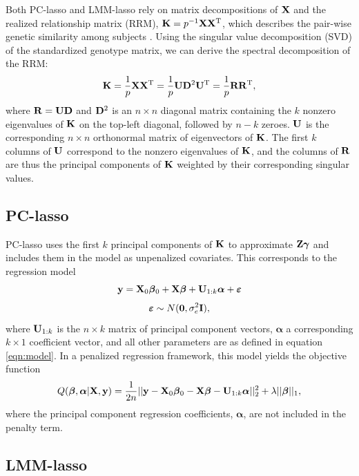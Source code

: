 Both PC-lasso and LMM-lasso rely on matrix decompositions of $\mathbf{X}$ and the realized relationship matrix (RRM), $\mathbf{K} = p^{-1} \mathbf{X} \mathbf{X}^{\text{T}}$, which describes the pair-wise genetic similarity among subjects \citep{patterson2006population, hayes2009increased}. Using the singular value decomposition (SVD) of the standardized genotype matrix, we can derive the spectral decomposition of the RRM: 
\begin{equation}
    \label{eqn:k}
    \mathbf{K} = \frac{1}{p} \mathbf{X} \mathbf{X}^{\text{T}} = \frac{1}{p} \mathbf{U} \mathbf{D}^2 \mathbf{U}^{\text{T}} = \frac{1}{p} \mathbf{R} \mathbf{R}^{\text{T}},
\end{equation}
where $\mathbf{R} = \mathbf{U}\mathbf{D}$ and $\mathbf{D}^2$ is an $n \times n$ diagonal matrix containing the $k$ nonzero eigenvalues of $\mathbf{K}$ on the top-left diagonal, followed by $n - k$ zeroes. $\mathbf{U}$ is the corresponding $n \times n$ orthonormal matrix of eigenvectors of $\mathbf{K}$. The first $k$ columns of $\mathbf{U}$ correspond to the nonzero eigenvalues of $\mathbf{K}$, and the columns of $\mathbf{R}$ are thus the principal components of $\mathbf{K}$ weighted by their corresponding singular values. 

\subsection{PC-lasso}
PC-lasso uses the first $k$ principal components of $\mathbf{K}$ to approximate $\mathbf{Z}\boldsymbol{\gamma}$ and includes them in the model as unpenalized covariates. This corresponds to the regression model
\begin{equation}
    \label{eqn:pca_reg}
    \mathbf{y} = \mathbf{X}_0\boldsymbol{\beta}{}_0 + \mathbf{X}\boldsymbol{\beta}{} + \mathbf{U}_{1:k}\boldsymbol{\alpha} + \boldsymbol{\varepsilon}{} 
\end{equation}
$$ \boldsymbol{\varepsilon}{} \sim N(\boldsymbol{0}, \sigma^2_e \mathbf{I}), $$
where $\mathbf{U}_{1:k}$ is the $n \times k$ matrix of principal component vectors, $\boldsymbol{\alpha}$ a corresponding $k \times 1$ coefficient vector, and all other parameters are as defined in equation \eqref{eqn:model}. In a penalized regression framework, this model yields the objective function
\begin{equation}
    \label{eqn:pca_obj}
    Q(\boldsymbol{\beta}{}, \boldsymbol{\alpha}|\mathbf{X}, \mathbf{y}) = \frac{1}{2n} ||\mathbf{y} - \mathbf{X}_0\boldsymbol{\beta}{}_0 - \mathbf{X} \boldsymbol{\beta}{}- \mathbf{U}_{1:k}\boldsymbol{\alpha}||_2^2 + \lambda || \boldsymbol{\beta}{} ||_1,
\end{equation}
where the principal component regression coefficients, $\boldsymbol{\alpha}$, are not included in the penalty term. 

\subsection{LMM-lasso}
\label{sec:lmmlasso}

